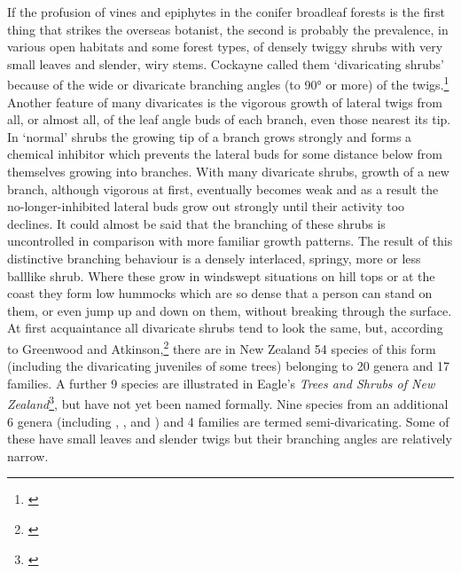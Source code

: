 If the profusion of vines and epiphytes in the conifer broadleaf forests is the first thing that strikes the overseas botanist, the second is probably the prevalence, in various open habitats and some forest types, of densely twiggy shrubs with very small leaves and slender, wiry stems.
Cockayne called them `divaricating shrubs' because of the wide or divaricate branching angles (to 90° or more) of the twigs.\footnote{\cite{cockayne1912observations}}
Another feature of many divaricates is the vigorous growth of lateral twigs from all, or almost all, of the leaf angle buds of each branch, even those nearest its tip.
In `normal' shrubs the growing tip of a branch grows strongly and forms a chemical inhibitor which prevents the lateral buds for some distance below from themselves growing into branches.
With many divaricate shrubs, growth of a new branch, although vigorous at first, eventually becomes weak and as a result the no-longer-inhibited lateral buds grow out strongly until their activity too declines.
It could almost be said that the branching of these shrubs is uncontrolled in comparison with more familiar growth patterns.
The result of this distinctive branching behaviour is a densely interlaced, springy, more or less balllike shrub.
Where these grow in windswept situations on hill tops or at the coast they form low hummocks which are so dense that a person can stand on them, or even jump up and down on them, without breaking through the surface.
At first acquaintance all divaricate shrubs tend to look the same, but, according to Greenwood and Atkinson,\footnote{\cite{greenwood1977evolution}} there are in New Zealand 54 species of this form (including the divaricating juveniles of some trees) belonging to 20 genera and 17 families.
A further 9 species are illustrated in Eagle's \emph{Trees and Shrubs of New Zealand}\footnote{\cite{eagle1982trees}}, but have not yet been named formally.
Nine species from an additional 6 genera (including , ,  and ) and 4 families are termed semi-divaricating.
Some of these have small leaves and slender twigs but their branching angles are relatively narrow.

